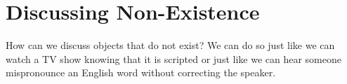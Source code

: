 \documentclass[a4paper, 12pt]{article}
\begin{document}
\section{Discussing Non-Existence}
How can we discuss objects that do not exist? We can do so just like we can watch a TV show knowing that it is scripted or just like we can hear someone mispronounce an English word without correcting the speaker.
\end{document}
